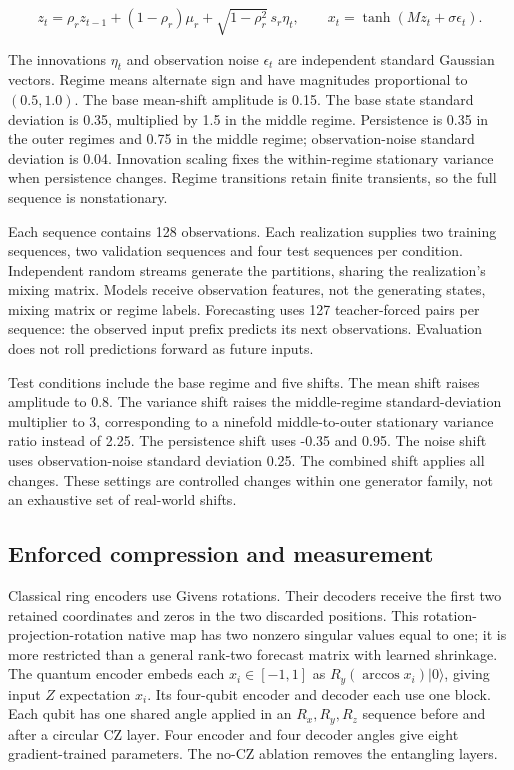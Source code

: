 \documentclass[
  11pt,
]{article}
\begin{document}
\[z_t=\rho_r z_{t-1}+(1-\rho_r)\mu_r+\sqrt{1-\rho_r^2}\,s_r\eta_t,
\qquad x_t=\tanh(Mz_t+\sigma\epsilon_t).\]

The innovations \(\eta_t\) and observation noise \(\epsilon_t\) are
independent standard Gaussian vectors. Regime means alternate sign and
have magnitudes proportional to \((0.5,1.0)\). The base mean-shift
amplitude is 0.15. The base state standard deviation is 0.35, multiplied
by 1.5 in the middle regime. Persistence is 0.35 in the outer regimes
and 0.75 in the middle regime; observation-noise standard deviation is
0.04. Innovation scaling fixes the within-regime stationary variance
when persistence changes. Regime transitions retain finite transients,
so the full sequence is nonstationary.

Each sequence contains 128 observations. Each realization supplies two
training sequences, two validation sequences and four test sequences per
condition. Independent random streams generate the partitions, sharing
the realization's mixing matrix. Models receive observation features,
not the generating states, mixing matrix or regime labels. Forecasting
uses 127 teacher-forced pairs per sequence: the observed input prefix
predicts its next observations. Evaluation does not roll predictions
forward as future inputs.

Test conditions include the base regime and five shifts. The mean shift
raises amplitude to 0.8. The variance shift raises the middle-regime
standard-deviation multiplier to 3, corresponding to a ninefold
middle-to-outer stationary variance ratio instead of 2.25. The
persistence shift uses -0.35 and 0.95. The noise shift uses
observation-noise standard deviation 0.25. The combined shift applies
all changes. These settings are controlled changes within one generator
family, not an exhaustive set of real-world shifts.

\hypertarget{enforced-compression-and-measurement}{%
\subsection{Enforced compression and
measurement}\label{enforced-compression-and-measurement}}

Classical ring encoders use Givens rotations. Their decoders receive the
first two retained coordinates and zeros in the two discarded positions.
This rotation-projection-rotation native map has two nonzero singular
values equal to one; it is more restricted than a general rank-two
forecast matrix with learned shrinkage. The quantum encoder embeds each
\(x_i\in[-1,1]\) as \(R_y(\arccos x_i)|0\rangle\), giving input \(Z\)
expectation \(x_i\). Its four-qubit encoder and decoder each use one
block. Each qubit has one shared angle applied in an \(R_x,R_y,R_z\)
sequence before and after a circular CZ layer. Four encoder and four
decoder angles give eight gradient-trained parameters. The no-CZ
ablation removes the entangling layers.
\end{document}
